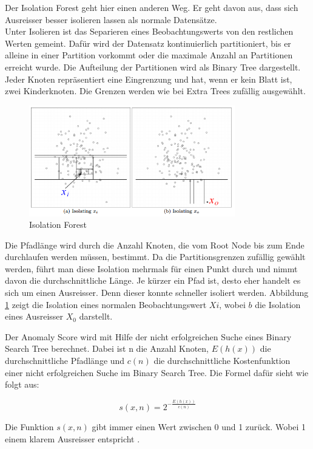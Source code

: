 Der Isolation Forest geht hier einen anderen Weg. Er geht davon aus, dass sich Ausreisser besser isolieren lassen als normale Datensätze.\\
Unter Isolieren ist das Separieren eines Beobachtungswerts von den restlichen Werten gemeint. Dafür wird der Datensatz kontinuierlich partitioniert, bis er alleine in einer Partition vorkommt oder die maximale Anzahl an Partitionen erreicht wurde. Die Aufteilung der Partitionen wird als Binary Tree dargestellt. Jeder Knoten repräsentiert eine Eingrenzung und hat, wenn er kein Blatt ist, zwei Kinderknoten. Die Grenzen werden wie bei Extra Trees zufällig ausgewählt.\\

\begin{figure}[h]
  \centering
  \includegraphics[width=0.8\textwidth]{images/isolation_forest.png}
  \caption[Isolation Forest]{Isolation Forest}%
  \label{fig:hintergrund_isolation_forest}
\end{figure}

Die Pfadlänge wird durch die Anzahl Knoten, die vom Root Node bis zum Ende durchlaufen werden müssen, bestimmt. Da die Partitionsgrenzen zufällig gewählt werden, führt man diese Isolation mehrmals für einen Punkt durch und nimmt davon die durchschnittliche Länge. Je kürzer ein Pfad ist, desto eher handelt es sich um einen Ausreisser. Denn dieser konnte schneller isoliert werden. Abbildung \ref{fig:hintergrund_isolation_forest} zeigt die Isolation  eines normalen Beobachtungswert $Xi$, wobei $b$ die Isolation eines Ausreisser $X_0$ darstellt.

Der Anomaly Score wird mit Hilfe der nicht erfolgreichen Suche eines Binary Search Tree berechnet. Dabei ist n die Anzahl Knoten, $E(h(x))$ die durchschnittliche Pfadlänge und $c(n)$ die durchschnittliche Kostenfunktion einer nicht erfolgreichen Suche im Binary Search Tree. Die Formel dafür sieht wie folgt aus:

\begin{equation}\label{eq:isolation}
s(x, n) = 2^{-\frac{E(h(x))}{c(n)}}
\end{equation}

Die Funktion $s(x, n)$ gibt immer einen Wert zwischen 0 und 1 zurück. Wobei 1 einem klarem Ausreisser entspricht \cite{isolation_forest_2}.